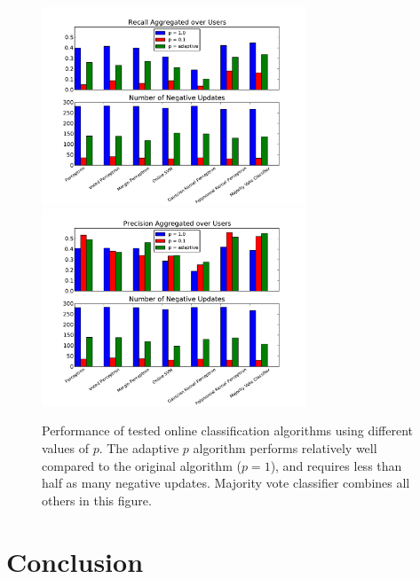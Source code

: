 \documentclass[12pt]{article}
\begin{document}
\begin{figure}\centering
\includegraphics[width=0.7\textwidth]{EveryoneRecallPaper.pdf}
\includegraphics[width=0.7\textwidth]{EveryonePrecisionPaper.pdf}
\label{fig:PrecisionandRecall}
\caption{Performance of tested online classification algorithms using different values of $p$.  The adaptive $p$ algorithm performs relatively well compared to the original algorithm ($p = 1$), and requires less than half as many negative updates.  Majority vote classifier combines all others in this figure.}
\end{figure}


\section{Conclusion}
\end{document}
